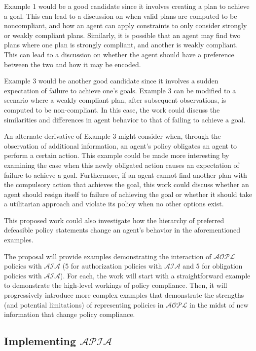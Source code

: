 Example 1 would be a good candidate since it involves creating a plan to achieve a goal.
This can lead to a discussion on when valid plans are computed to be noncompliant, and how an agent can apply constraints to only consider strongly or weakly compliant plans.
Similarly, it is possible that an agent may find two plans where one plan is strongly compliant, and another is weakly compliant.
This can lead to a discussion on whether the agent should have a preference between the two and how it may be encoded.

Example 3 would be another good candidate since it involves a sudden expectation of failure to achieve one's goals.
Example 3 can be modified to a scenario where a weakly compliant plan, after subsequent observations, is computed to be non-compliant.
In this case, the work could discuss the similarities and differences in agent behavior to that of failing to achieve a goal.

An alternate derivative of Example 3 might consider when, through the observation of additional information, an agent's policy obligates an agent to perform a certain action.
This example could be made more interesting by examining the case when this newly obligated action causes an expectation of failure to achieve a goal.
Furthermore, if an agent cannot find another plan with the compulsory action that achieves the goal, this work could discuss whether an agent should resign itself to failure of achieving the goal or whether it should take a utilitarian approach and violate its policy when no other options exist.

This proposed work could also investigate how the hierarchy of preferred defeasible policy statements change an agent's behavior in the aforementioned examples.

The proposal will provide examples demonstrating the interaction of $\mathcal{AOPL}$ policies with $\mathcal{AIA}$ (5 for authorization policies with $\mathcal{AIA}$ and 5 for obligation policies with $\mathcal{AIA}$).
For each, the work will start with a straightforward example to demonstrate the high-level workings of policy compliance.
Then, it will progressively introduce more complex examples that demonstrate the strengths (and potential limitations) of representing policies in $\mathcal{AOPL}$ in the midst of new information that change policy compliance.

\subsection{Implementing $\mathcal{APIA}$}

